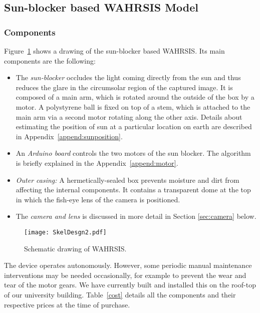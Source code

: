 \subsection{Sun-blocker based WAHRSIS Model} 
\subsubsection{Components} 
\label{sec:components}

Figure~\ref{fig:MechDesgn} shows a drawing of the sun-blocker based WAHRSIS. Its main components are the following:
\begin{itemize}
\item The \emph{sun-blocker} occludes the light coming directly from the sun and thus reduces the glare in the circumsolar region of the captured image. It is composed of a main arm, which is rotated around the outside of the box by a motor. A polystyrene ball is fixed on top of a stem, which is attached to the main arm via a second motor rotating along the other axis. Details about estimating the position of sun at a particular location on earth are described in Appendix~\ref{append:sunposition}.
\item An \emph{Arduino board} controls the two motors of the sun blocker. The algorithm is briefly explained in the Appendix~\ref{append:motor}.
\item \emph{Outer casing:} A hermetically-sealed box prevents moisture and dirt from affecting the internal components. It contains a transparent dome at the top in which the fish-eye lens of the camera is positioned.
\item The \emph{camera and lens} is discussed in more detail in Section \ref{sec:camera} below.
\end{itemize}

\begin{figure}[htb]
\begin{center}
\texttt{[image: SkelDesgn2.pdf]}
 \caption{Schematic drawing of WAHRSIS.\label{fig:MechDesgn}}
\end{center}
\end{figure}

The device operates autonomously. However, some periodic manual maintenance interventions may be needed occasionally, for example to prevent the wear and tear of the motor gears. We have currently built and installed this on the roof-top of our university building. Table~\ref{cost} details all the components and their respective prices at the time of purchase.

